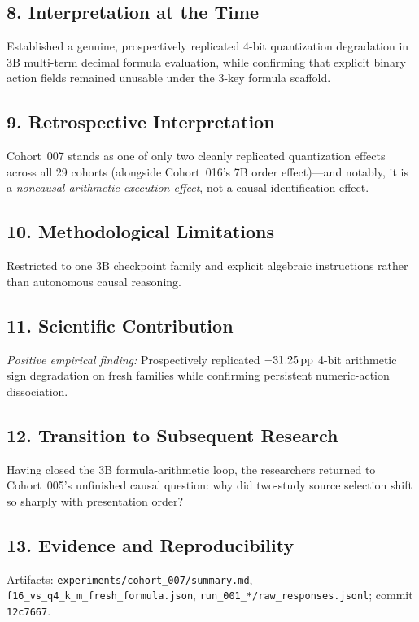 \subsection*{8. Interpretation at the Time}
Established a genuine, prospectively replicated 4-bit quantization degradation in 3B multi-term decimal formula evaluation, while confirming that explicit binary action fields remained unusable under the 3-key formula scaffold.

\subsection*{9. Retrospective Interpretation}
Cohort~007 stands as one of only two cleanly replicated quantization effects across all 29 cohorts (alongside Cohort~016's 7B order effect)---and notably, it is a \emph{noncausal arithmetic execution effect}, not a causal identification effect.

\subsection*{10. Methodological Limitations}
Restricted to one 3B checkpoint family and explicit algebraic instructions rather than autonomous causal reasoning.

\subsection*{11. Scientific Contribution}
\emph{Positive empirical finding:} Prospectively replicated $-31.25\,\mathrm{pp}$ 4-bit arithmetic sign degradation on fresh families while confirming persistent numeric-action dissociation.

\subsection*{12. Transition to Subsequent Research}
Having closed the 3B formula-arithmetic loop, the researchers returned to Cohort~005's unfinished causal question: why did two-study source selection shift so sharply with presentation order?

\subsection*{13. Evidence and Reproducibility}
Artifacts: \texttt{experiments/cohort\_007/summary.md}, \texttt{f16\_vs\_q4\_k\_m\_fresh\_formula.json}, \texttt{run\_001\_*/raw\_responses.jsonl}; commit \texttt{12c7667}.
